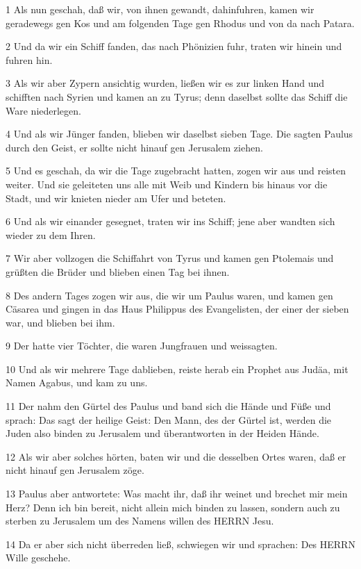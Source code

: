 \par 1 Als nun geschah, daß wir, von ihnen gewandt, dahinfuhren, kamen wir geradewegs gen Kos und am folgenden Tage gen Rhodus und von da nach Patara.
\par 2 Und da wir ein Schiff fanden, das nach Phönizien fuhr, traten wir hinein und fuhren hin.
\par 3 Als wir aber Zypern ansichtig wurden, ließen wir es zur linken Hand und schifften nach Syrien und kamen an zu Tyrus; denn daselbst sollte das Schiff die Ware niederlegen.
\par 4 Und als wir Jünger fanden, blieben wir daselbst sieben Tage. Die sagten Paulus durch den Geist, er sollte nicht hinauf gen Jerusalem ziehen.
\par 5 Und es geschah, da wir die Tage zugebracht hatten, zogen wir aus und reisten weiter. Und sie geleiteten uns alle mit Weib und Kindern bis hinaus vor die Stadt, und wir knieten nieder am Ufer und beteten.
\par 6 Und als wir einander gesegnet, traten wir ins Schiff; jene aber wandten sich wieder zu dem Ihren.
\par 7 Wir aber vollzogen die Schiffahrt von Tyrus und kamen gen Ptolemais und grüßten die Brüder und blieben einen Tag bei ihnen.
\par 8 Des andern Tages zogen wir aus, die wir um Paulus waren, und kamen gen Cäsarea und gingen in das Haus Philippus des Evangelisten, der einer der sieben war, und blieben bei ihm.
\par 9 Der hatte vier Töchter, die waren Jungfrauen und weissagten.
\par 10 Und als wir mehrere Tage dablieben, reiste herab ein Prophet aus Judäa, mit Namen Agabus, und kam zu uns.
\par 11 Der nahm den Gürtel des Paulus und band sich die Hände und Füße und sprach: Das sagt der heilige Geist: Den Mann, des der Gürtel ist, werden die Juden also binden zu Jerusalem und überantworten in der Heiden Hände.
\par 12 Als wir aber solches hörten, baten wir und die desselben Ortes waren, daß er nicht hinauf gen Jerusalem zöge.
\par 13 Paulus aber antwortete: Was macht ihr, daß ihr weinet und brechet mir mein Herz? Denn ich bin bereit, nicht allein mich binden zu lassen, sondern auch zu sterben zu Jerusalem um des Namens willen des HERRN Jesu.
\par 14 Da er aber sich nicht überreden ließ, schwiegen wir und sprachen: Des HERRN Wille geschehe.
